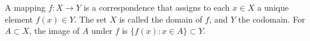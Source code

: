 A mapping $f: X \rightarrow Y$ is a correspondence that assigns to each $x \in X$ a unique element $f(x) \in Y$. The set $X$ is called the domain of $f$, and $Y$ the codomain. For $A \subset X$, the image of $A$ under $f$ is $\{f(x): x \in A\} \subset Y$.
